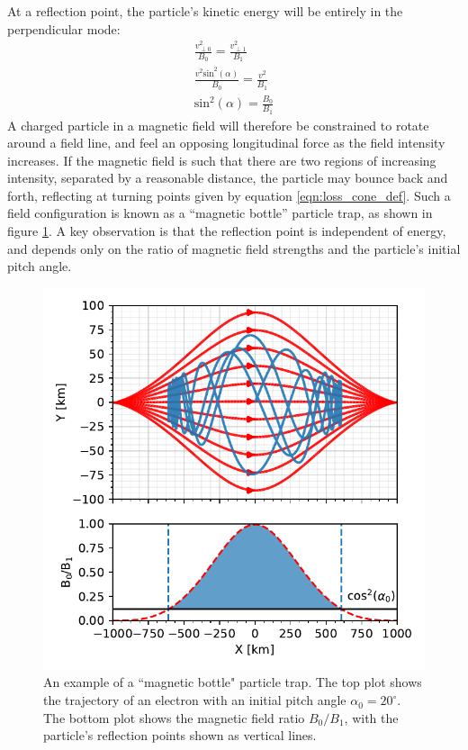 \noindent At a reflection point, the particle's kinetic energy will be entirely in the perpendicular mode:
\begin{eqnarray}
\frac{v_{\perp0}^2}{B_0} = \frac{v_{\perp1}^2}{B_1} \\
\frac{v^2\mathrm{sin}^2(\alpha)}{B_0} = \frac{v^2}{B_1} \\
\mathrm{sin}^2(\alpha)=\frac{B_0}{B_1} 
\label{eqn:loss_cone_def}
\end{eqnarray}
\noindent A charged particle in a magnetic field will therefore be constrained to rotate around a field line, and feel an opposing longitudinal force as the field intensity increases. If the magnetic field is such that there are two regions of increasing intensity, separated by a reasonable distance,  the particle may bounce back and forth, reflecting at turning points given by equation \ref{eqn:loss_cone_def}. Such a field configuration is known as a ``magnetic bottle'' particle trap, as shown in figure \ref{fig:bottle}. A key observation is that the reflection point is independent of energy, and depends only on the ratio of magnetic field strengths and the particle's initial pitch angle.
\begin{figure}[ht]
\begin{center}
\includegraphics{figures/bottle.pdf}
\caption[An example of a ``magnetic bottle'' particle trap]{An example of a ``magnetic bottle" particle trap. The top plot shows the trajectory of an electron with an initial pitch angle $\alpha_0=20^\circ$. The bottom plot shows the magnetic field ratio $B_0/B_1$, with the particle's reflection points shown as vertical lines. }
\label{fig:bottle}
\end{center}
\end{figure}

